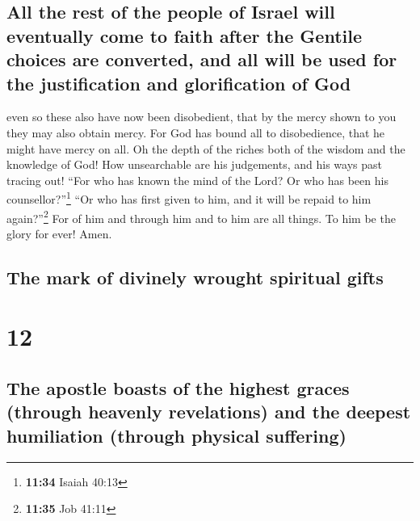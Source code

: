 \hypertarget{all-the-rest-of-the-people-of-israel-will-eventually-come-to-faith-after-the-gentile-choices-are-converted-and-all-will-be-used-for-the-justification-and-glorification-of-god}{%
\subsection{All the rest of the people of Israel will eventually come to
faith after the Gentile choices are converted, and all will be used for
the justification and glorification of
God}\label{all-the-rest-of-the-people-of-israel-will-eventually-come-to-faith-after-the-gentile-choices-are-converted-and-all-will-be-used-for-the-justification-and-glorification-of-god}}

 even so these also have now been disobedient, that by
the mercy shown to you they may also obtain mercy.  For
God has bound all to disobedience, that he might have mercy on all.
 Oh the depth of the riches both of the wisdom and the
knowledge of God! How unsearchable are his judgements, and his ways past
tracing out!  ``For who has known the mind of the Lord?
Or who has been his counsellor?''\footnote{\textbf{11:34} Isaiah 40:13}
 ``Or who has first given to him, and it will be repaid
to him again?''\footnote{\textbf{11:35} Job 41:11}  For
of him and through him and to him are all things. To him be the glory
for ever! Amen.

\hypertarget{the-mark-of-divinely-wrought-spiritual-gifts}{%
\subsection{The mark of divinely wrought spiritual
gifts}\label{the-mark-of-divinely-wrought-spiritual-gifts}}

\hypertarget{section-11}{%
\section{12}\label{section-11}}

\hypertarget{the-apostle-boasts-of-the-highest-graces-through-heavenly-revelations-and-the-deepest-humiliation-through-physical-suffering}{%
\subsection{The apostle boasts of the highest graces (through heavenly
revelations) and the deepest humiliation (through physical
suffering)}\label{the-apostle-boasts-of-the-highest-graces-through-heavenly-revelations-and-the-deepest-humiliation-through-physical-suffering}}

